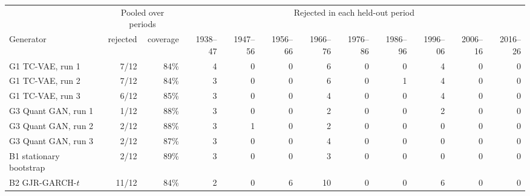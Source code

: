\begin{tabular}{lrrrrrrrrrrr}
\toprule
& \multicolumn{2}{c}{Pooled over periods} & \multicolumn{9}{c}{Rejected in each held-out period} \\
\cmidrule(lr){2-3}\cmidrule(lr){4-12}
Generator & rejected & coverage & 1938--47 & 1947--56 & 1956--66 & 1966--76 & 1976--86 & 1986--96 & 1996--06 & 2006--16 & 2016--26 \\
\midrule
G1 TC-VAE, run 1 & 7/12 & 84\% & 4 & 0 & 0 & 6 & 0 & 0 & 4 & 0 & 0 \\
G1 TC-VAE, run 2 & 7/12 & 84\% & 3 & 0 & 0 & 6 & 0 & 1 & 4 & 0 & 0 \\
G1 TC-VAE, run 3 & 6/12 & 85\% & 3 & 0 & 0 & 4 & 0 & 0 & 4 & 0 & 0 \\
G3 Quant GAN, run 1 & 1/12 & 88\% & 3 & 0 & 0 & 2 & 0 & 0 & 2 & 0 & 0 \\
G3 Quant GAN, run 2 & 2/12 & 88\% & 3 & 1 & 0 & 2 & 0 & 0 & 0 & 0 & 0 \\
G3 Quant GAN, run 3 & 2/12 & 87\% & 3 & 0 & 0 & 4 & 0 & 0 & 0 & 0 & 0 \\
\addlinespace
B1 stationary bootstrap & 2/12 & 89\% & 3 & 0 & 0 & 3 & 0 & 0 & 0 & 0 & 0 \\
B2 GJR-GARCH-$t$ & 11/12 & 84\% & 2 & 0 & 6 & 10 & 0 & 0 & 6 & 0 & 0 \\
\bottomrule
\end{tabular}
